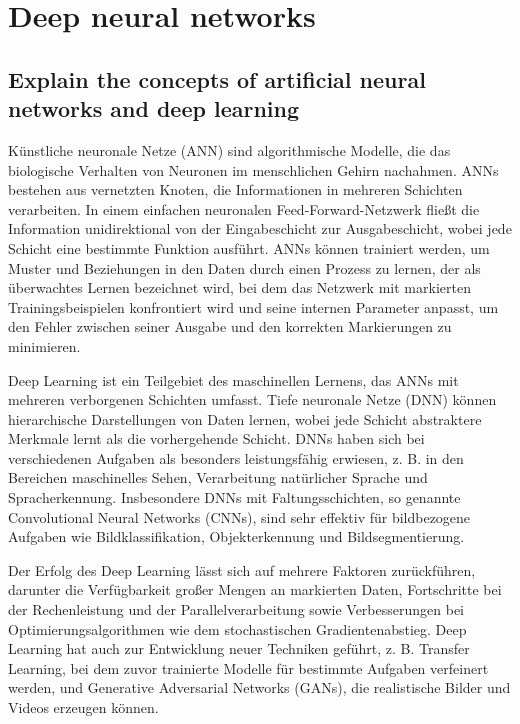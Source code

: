 \chapter{Deep neural networks}

    \section{Explain the concepts of artificial neural networks and deep learning}

        Künstliche neuronale Netze (ANN) sind algorithmische Modelle, die das biologische Verhalten von Neuronen
        im menschlichen Gehirn nachahmen. ANNs bestehen aus vernetzten Knoten, die Informationen in mehreren
        Schichten verarbeiten. In einem einfachen neuronalen Feed-Forward-Netzwerk fließt die Information
        unidirektional von der Eingabeschicht zur Ausgabeschicht, wobei jede Schicht eine bestimmte Funktion
        ausführt. ANNs können trainiert werden, um Muster und Beziehungen in den Daten durch einen Prozess zu 
        lernen, der als überwachtes Lernen bezeichnet wird, bei dem das Netzwerk mit markierten Trainingsbeispielen
        konfrontiert wird und seine internen Parameter anpasst, um den Fehler zwischen seiner Ausgabe und den
        korrekten Markierungen zu minimieren.

        Deep Learning ist ein Teilgebiet des maschinellen Lernens, das ANNs mit mehreren verborgenen Schichten
        umfasst. Tiefe neuronale Netze (DNN) können hierarchische Darstellungen von Daten lernen, wobei jede
        Schicht abstraktere Merkmale lernt als die vorhergehende Schicht. DNNs haben sich bei verschiedenen
        Aufgaben als besonders leistungsfähig erwiesen, z. B. in den Bereichen maschinelles Sehen, Verarbeitung
        natürlicher Sprache und Spracherkennung. Insbesondere DNNs mit Faltungsschichten, so genannte Convolutional
        Neural Networks (CNNs), sind sehr effektiv für bildbezogene Aufgaben wie Bildklassifikation, Objekterkennung
        und Bildsegmentierung.
        
        Der Erfolg des Deep Learning lässt sich auf mehrere Faktoren zurückführen, darunter die Verfügbarkeit großer
        Mengen an markierten Daten, Fortschritte bei der Rechenleistung und der Parallelverarbeitung sowie
        Verbesserungen bei Optimierungsalgorithmen wie dem stochastischen Gradientenabstieg. Deep Learning hat auch
        zur Entwicklung neuer Techniken geführt, z. B. Transfer Learning, bei dem zuvor trainierte Modelle für
        bestimmte Aufgaben verfeinert werden, und Generative Adversarial Networks (GANs), die realistische Bilder
        und Videos erzeugen können.

